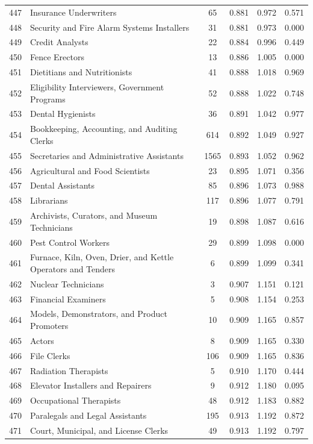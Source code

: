 {\begin{longtable}{llcccc}
 447 & Insurance Underwriters & 65 & 0.881 & 0.972 & 0.571 \\
 448 & Security and Fire Alarm Systems Installers & 31 & 0.881 & 0.973 & 0.000 \\
 449 & Credit Analysts & 22 & 0.884 & 0.996 & 0.449 \\
 450 & Fence Erectors & 13 & 0.886 & 1.005 & 0.000 \\
 451 & Dietitians and Nutritionists & 41 & 0.888 & 1.018 & 0.969 \\
 452 & Eligibility Interviewers, Government Programs & 52 & 0.888 & 1.022 & 0.748 \\
 453 & Dental Hygienists & 36 & 0.891 & 1.042 & 0.977 \\
 454 & Bookkeeping, Accounting, and Auditing Clerks & 614 & 0.892 & 1.049 & 0.927 \\
 455 & Secretaries and Administrative Assistants & 1565 & 0.893 & 1.052 & 0.962 \\
 456 & Agricultural and Food Scientists & 23 & 0.895 & 1.071 & 0.356 \\
 457 & Dental Assistants & 85 & 0.896 & 1.073 & 0.988 \\
 458 & Librarians & 117 & 0.896 & 1.077 & 0.791 \\
 459 & Archivists, Curators, and Museum Technicians & 19 & 0.898 & 1.087 & 0.616 \\
 460 & Pest Control Workers & 29 & 0.899 & 1.098 & 0.000 \\
 461 & Furnace, Kiln, Oven, Drier, and Kettle Operators and Tenders & 6 & 0.899 & 1.099 & 0.341 \\
 462 & Nuclear Technicians & 3 & 0.907 & 1.151 & 0.121 \\
 463 & Financial Examiners & 5 & 0.908 & 1.154 & 0.253 \\
 464 & Models, Demonstrators, and Product Promoters & 10 & 0.909 & 1.165 & 0.857 \\
 465 & Actors & 8 & 0.909 & 1.165 & 0.330 \\
 466 & File Clerks & 106 & 0.909 & 1.165 & 0.836 \\
 467 & Radiation Therapists & 5 & 0.910 & 1.170 & 0.444 \\
 468 & Elevator Installers and Repairers & 9 & 0.912 & 1.180 & 0.095 \\
 469 & Occupational Therapists & 48 & 0.912 & 1.183 & 0.882 \\
 470 & Paralegals and Legal Assistants & 195 & 0.913 & 1.192 & 0.872 \\
 471 & Court, Municipal, and License Clerks & 49 & 0.913 & 1.192 & 0.797 \\

\end{longtable}}
